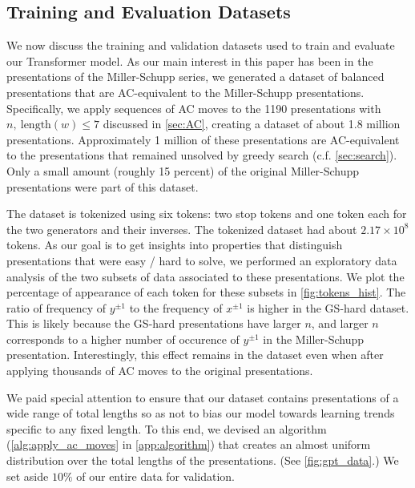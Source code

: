 \subsection{Training and Evaluation Datasets\label{sec:transformer_datasets}}

We now discuss the training and validation datasets used to train and evaluate our Transformer model. As our main interest in this paper has been in the presentations of the Miller-Schupp series, we generated a dataset of balanced presentations that are AC-equivalent to the Miller-Schupp presentations. Specifically, we apply sequences of AC moves to the 1190 presentations with $n,\ \text{length}(w) \leq 7$ discussed in \autoref{sec:AC}, creating a dataset of about 1.8 million presentations. Approximately 1 million of these presentations are AC-equivalent to the presentations that remained unsolved by greedy search (c.f. \autoref{sec:search}).
Only a small amount (roughly 15 percent) of the original Miller-Schupp presentations were part of this dataset.
\newline

The dataset is tokenized using six tokens: two stop tokens and one token each for the two generators and their inverses. The tokenized dataset had about $2.17 \times 10^8$ tokens. As our goal is to get insights into properties that distinguish presentations that were easy / hard to solve, we performed an exploratory data analysis of the two subsets of data associated to these presentations. We plot the percentage of appearance of each token for these subsets in \autoref{fig:tokens_hist}. 
The ratio of frequency of $y^{\pm 1}$ to the frequency of $x^{\pm 1}$ is higher in the GS-hard dataset. This is likely because the GS-hard presentations have larger $n$, and larger $n$ corresponds to a higher number of occurence of $y^{\pm 1}$ in the Miller-Schupp presentation. Interestingly, this effect remains in the dataset even when after applying thousands of AC moves to the original presentations.
\newline 

We paid special attention to ensure that our dataset contains presentations of a wide range of total lengths so as not to bias our model towards learning trends specific to any fixed length. To this end, we devised an algorithm (\autoref{alg:apply_ac_moves} in \autoref{app:algorithm}) that creates an almost uniform distribution over the total lengths of the presentations. (See \autoref{fig:gpt_data}.) We set aside $10\%$ of our entire data for validation.
\newline 

